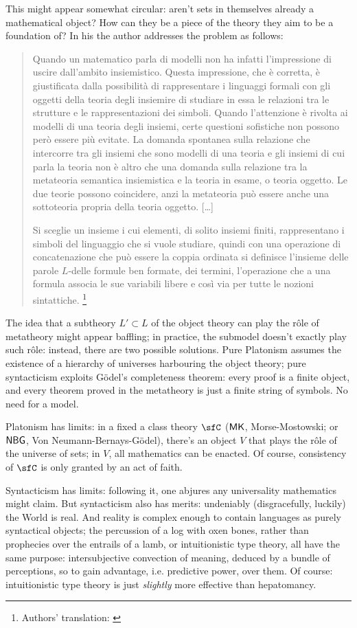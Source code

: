 This might appear somewhat circular: aren't sets in themselves already a mathematical object? How can they be a piece of the theory they aim to be a foundation of? In his \cite{lolli1977categorie} the author addresses the problem as follows:
\begin{quote}
	Quando un matematico parla di modelli non ha infatti l'impressione di uscire dall'ambito insiemistico. Questa impressione, che è corretta, è giustificata dalla possibilità di rappresentare i linguaggi formali con gli oggetti della teoria degli insiemire di studiare in essa le relazioni tra le strutture e le rappresentazioni dei simboli. Quando l'attenzione è rivolta ai modelli di una teoria degli insiemi, certe questioni sofistiche non possono però essere più evitate. La domanda spontanea sulla relazione che intercorre tra gli insiemi che so­no modelli di una teoria e gli insiemi di cui parla la teoria non è altro che una domanda sulla relazione tra la metateoria semantica insiemi­stica e la teoria in esame, o teoria oggetto. Le due teorie possono coincidere, anzi la metateoria può essere anche una sottoteoria pro­pria della teoria oggetto. [\dots\unkern]

	Si sceglie un insieme i cui elementi, di solito insiemi finiti, rappresentano i simboli del linguaggio che si vuole studiare, quindi con una operazione di concatenazione che può essere la coppia ordinata si definisce l'insieme delle parole $L$-delle for­mule ben formate, dei termini, l'operazione che a una formula asso­cia le sue variabili libere e così via per tutte le nozioni sintattiche.
	\footnote{Authors' translation: \emph{}}
\end{quote}
The idea that a subtheory $L'\subset L$ of the object theory can play the r\^ole of metatheory might appear baffling; in practice, the submodel doesn't exactly play such r\^ole: instead, there are two possible solutions. Pure Platonism assumes the existence of a hierarchy of universes harbouring the object theory; pure syntacticism exploits G\"odel's completeness theorem: every proof is a finite object, and every theorem proved in the metatheory is just a finite string of symbols. No need for a model.

Platonism has limits: in a fixed a class theory $\sfC$ ($\sf MK$, Morse-Mostowski; or $\sf NBG$, Von Neumann-Bernays-G\"odel), there's an object $V$ that plays the r\^ole of the universe of sets; in $V$, all mathematics can be enacted. Of course, consistency of $\sfC$ is only granted by an act of faith.

Syntacticism has limits: following it, one abjures any universality mathematics might claim. But syntacticism also has merits: undeniably (disgracefully, luckily) the World is real. And reality is complex enough to contain languages as purely syntactical objects; the percussion of a log with oxen bones, rather than prophecies over the entrails of a lamb, or intuitionistic type theory, all have the same purpose: intersubjective convection of meaning, deduced by a bundle of perceptions, so to gain advantage, i.e. predictive power, over them. Of course: intuitionistic type theory is just \emph{slightly} more effective than hepatomancy.

